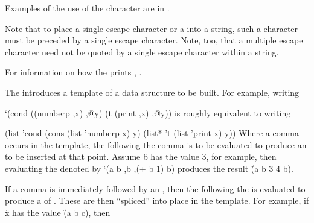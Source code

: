 Examples of the use of the  character are in \thenextfigure. 


Note that to place a single escape character or a  into a string,
such a character must be preceded by a single escape character.
Note, too, that a multiple escape character need not be quoted by a 
single escape character within a string.


For information on how the  prints ,
\seesection\PrintingStrings.

\endsubsection%



The  introduces a template of a data structure to be built.  
For example, writing

\code
 `(cond ((numberp ,x) ,@y) (t (print ,x) ,@y))
\endcode
is roughly equivalent to writing

\code
 (list 'cond 
       (cons (list 'numberp x) y) 
       (list* 't (list 'print x) y))
\endcode
Where a comma
occurs in the template, 
the 
following the comma is to be evaluated to produce an  to
be inserted at that point.  Assume \f{b} has the value 3, for example, then
evaluating the  denoted by \f{`(a b ,b ,(+ b 1) b)} produces
the result \f{(a b 3 4 b)}.


If a comma is immediately followed by an , 
then the  following the 
is evaluated to produce a  of .
These  are then ``spliced'' into place in the template.  For
example, if \f{x} has the value \f{(a b c)}, then


